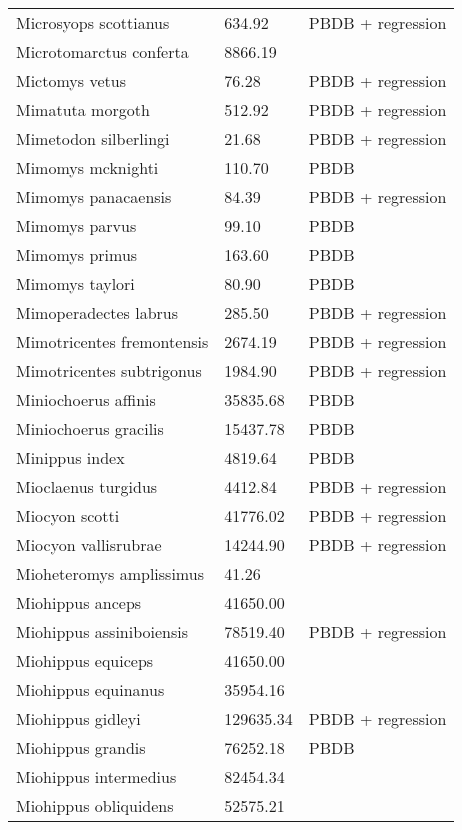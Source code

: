 \documentclass{article}
\begin{document}
\begin{center}
\begin{longtable}{p{} p{} p{}}
    Microsyops scottianus & 634.92 & PBDB + regression \\ 
    Microtomarctus conferta & 8866.19 & \cite{Tomiya2013} \\ 
    Mictomys vetus & 76.28 & PBDB + regression \\ 
    Mimatuta morgoth & 512.92 & PBDB + regression \\ 
    Mimetodon silberlingi & 21.68 & PBDB + regression \\ 
    Mimomys mcknighti & 110.70 & PBDB \\ 
    Mimomys panacaensis & 84.39 & PBDB + regression \\ 
    Mimomys parvus & 99.10 & PBDB \\ 
    Mimomys primus & 163.60 & PBDB \\ 
    Mimomys taylori & 80.90 & PBDB \\ 
    Mimoperadectes labrus & 285.50 & PBDB + regression \\ 
    Mimotricentes fremontensis & 2674.19 & PBDB + regression \\ 
    Mimotricentes subtrigonus & 1984.90 & PBDB + regression \\ 
    Miniochoerus affinis & 35835.68 & PBDB \\ 
    Miniochoerus gracilis & 15437.78 & PBDB \\ 
    Minippus index & 4819.64 & PBDB \\ 
    Mioclaenus turgidus & 4412.84 & PBDB + regression \\ 
    Miocyon scotti & 41776.02 & PBDB + regression \\ 
    Miocyon vallisrubrae & 14244.90 & PBDB + regression \\ 
    Mioheteromys amplissimus & 41.26 & \cite{Tomiya2013} \\ 
    Miohippus anceps & 41650.00 & \cite{McKenna2011} \\ 
    Miohippus assiniboiensis & 78519.40 & PBDB + regression \\ 
    Miohippus equiceps & 41650.00 & \cite{McKenna2011} \\ 
    Miohippus equinanus & 35954.16 & \cite{Tomiya2013} \\ 
    Miohippus gidleyi & 129635.34 & PBDB + regression \\ 
    Miohippus grandis & 76252.18 & PBDB \\ 
    Miohippus intermedius & 82454.34 & \cite{Tomiya2013} \\ 
    Miohippus obliquidens & 52575.21 & \cite{Tomiya2013} \\ 

\end{longtable}
\end{center}
\end{document}

